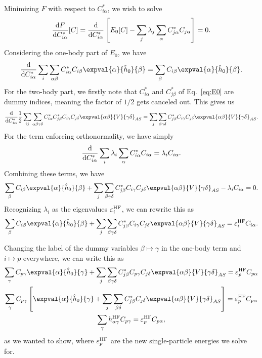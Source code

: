 Minimizing $F$ with respect to $C^*_{i\alpha}$, we wish to solve
\begin{equation*}
    \frac{\mathop{}\!\mathrm{d} F}{\mathop{}\!\mathrm{d} C^*_{i\alpha}}[C] = \frac{\mathop{}\!\mathrm{d}}{\mathop{}\!\mathrm{d} C_{i \alpha}^*} \left[ E_0[C] - \sum_j \lambda_j \sum_{\alpha} C_{j \alpha}^* C_{j \alpha} \right] = 0.
\end{equation*}
Considering the one-body part of $E_0$, we have
\begin{equation*}
    \frac{\diff}{\diff C_{i \alpha}^*} \sum_{i} \sum_{\alpha\beta} C_{i \alpha}^* C_{i \beta}  \expval{\alpha}{\hat{h}_0}{\beta} = \sum_{\beta} C_{i \beta} \expval{\alpha}{\hat{h}_0}{\beta}.
\end{equation*}
For the two-body part, we firstly note that $C_{i \alpha}^*$ and $C_{j \beta}^*$ of Eq.~\eqref{eq:E0} are dummy indices, meaning the factor of $1/2$ gets canceled out.
This gives us
\begin{equation*}
    \frac{\diff}{\diff C_{i \alpha}^*} \frac{1}{2} \sum_{ij} \sum_{\alpha\beta\gamma\delta} C_{i \alpha}^* C_{j \beta}^* C_{i \gamma} C_{j \delta} \expval{\alpha\beta}{V}{\gamma\delta}_{AS} = \sum_j \sum_{\beta\gamma\delta} C_{j \beta}^* C_{i \gamma} C_{j \delta} \expval{\alpha\beta}{V}{\gamma\delta}_{AS}.
\end{equation*}
For the term enforcing orthonormality, we have simply
\begin{equation*}
    \frac{\mathop{}\!\mathrm{d}}{\mathop{}\!\mathrm{d} C_{i \alpha}^*} \sum_{i} \lambda_i \sum_{\alpha} C_{i \alpha}^* C_{i \alpha} = \lambda_i C_{i \alpha}.
\end{equation*}
Combining these terms, we have
\begin{equation*}
    \sum_{\beta} C_{i \beta} \expval{\alpha}{\hat{h}_0}{\beta} + \sum_j \sum_{\beta\gamma\delta} C_{j \beta}^* C_{i \gamma} C_{j \delta} \expval{\alpha\beta}{V}{\gamma\delta}_{AS} - \lambda_i C_{i \alpha} = 0.
\end{equation*}
Recognizing $\lambda_i$ as the eigenvalues $\varepsilon_i^{\mathrm{HF}}$, we can rewrite this as
\begin{equation*}
    \sum_{\beta} C_{i \beta} \expval{\alpha}{\hat{h}_0}{\beta} + \sum_j \sum_{\beta\gamma\delta} C_{j \beta}^* C_{i \gamma} C_{j \delta} \expval{\alpha\beta}{V}{\gamma\delta}_{AS} = \varepsilon_i^\HF C_{i \alpha}.
\end{equation*}

Changing the label of the dummy variables $\beta \mapsto \gamma$ in the one-body term and $i \mapsto p$ everywhere, we can write this as
\begin{gather*}
    \sum_{\gamma} C_{p \gamma} \expval{\alpha}{\hat{h}_0}{\gamma} + \sum_j \sum_{\beta\gamma\delta} C_{j \beta}^* C_{p \gamma} C_{j \delta} \expval{\alpha\beta}{V}{\gamma\delta}_{AS} = \varepsilon_p^\HF C_{p \alpha} \\
    \sum_{\gamma} C_{p \gamma} \left[ \expval{\alpha}{\hat{h}_0}{\gamma} + \sum_j \sum_{\beta\delta} C_{j \beta}^*  C_{j \delta} \expval{\alpha\beta}{V}{\gamma\delta}_{AS} \right] = \varepsilon_p^\HF C_{p \alpha} \\
    \sum_{\gamma} h_{\alpha\gamma}^\HF C_{p \gamma} = \varepsilon_p^\HF C_{p \alpha},
\end{gather*}
as we wanted to show, where $\varepsilon_p^{\mathrm{HF}}$ are the new single-particle energies we solve for.


